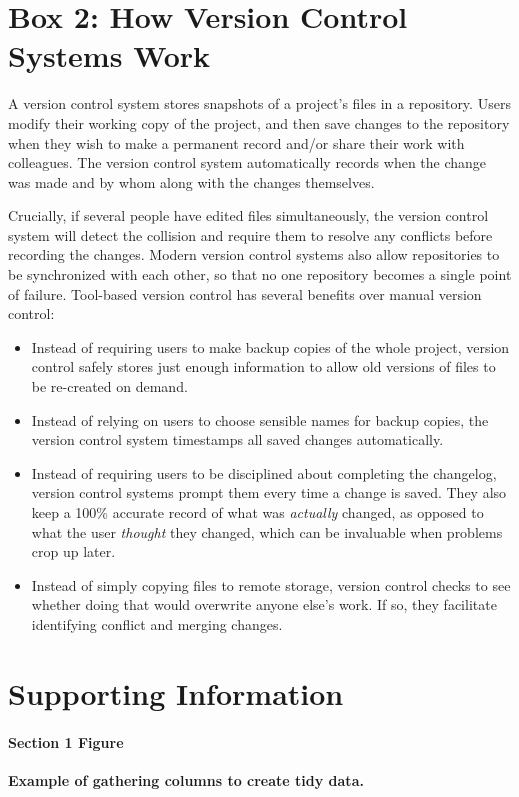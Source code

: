 \documentclass[10pt,letterpaper]{article}
\begin{document}
\section*{Box 2: How Version Control Systems Work}

A version control system stores snapshots of a project's files in a
repository. Users modify their working copy of the project, and then
save changes to the repository when they wish to make
a permanent record and/or share their work with colleagues. The
version control system automatically records when the change was
made and by whom along with the changes themselves.

Crucially, if several people have edited files simultaneously, the
version control system will detect the collision and require them to
resolve any conflicts before recording the changes. Modern version
control systems also allow repositories to be synchronized with each
other, so that no one repository becomes a single point of failure.
Tool-based version control has several benefits over manual version
control:

\begin{itemize}

\item
  Instead of requiring users to make backup copies of the whole project,
  version control safely stores just enough information to allow old
  versions of files to be re-created on demand.

\item
  Instead of relying on users to choose sensible names for backup
  copies, the version control system timestamps all saved changes
  automatically.

\item
  Instead of requiring users to be disciplined about completing the
  changelog, version control systems prompt them every time a change
  is saved. They also keep a 100\% accurate record of what was
  \emph{actually} changed, as opposed to what the user
  \emph{thought} they changed, which can be invaluable when problems
  crop up later.

\item
  Instead of simply copying files to remote storage, version control
  checks to see whether doing that would overwrite anyone else's
  work. If so, they facilitate identifying conflict and merging changes.

\end{itemize}

\pagebreak

\section*{Supporting Information}

\paragraph*{Section 1 Figure}
\label{S1_Fig}
\textbf{Example of gathering columns to create tidy data.}
\end{document}
